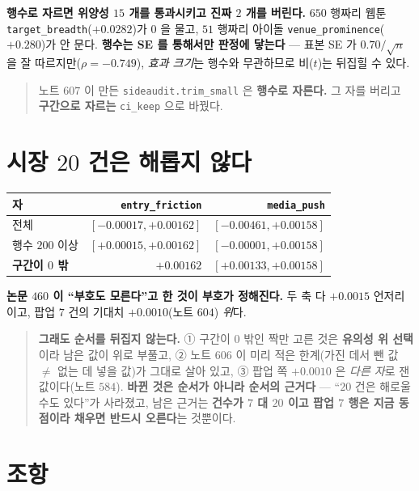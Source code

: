 \documentclass[11pt]{article}
\begin{document}
\textbf{행수로 자르면 위양성 $15$ 개를 통과시키고 진짜 $2$ 개를 버린다.}
$650$ 행짜리 웹툰 \texttt{target\_breadth}($+0.0282$)가 $0$ 을 물고,
$51$ 행짜리 아이돌 \texttt{venue\_prominence}($+0.280$)가 안 문다.
\textbf{행수는 SE 를 통해서만 판정에 닿는다} --- 표본 SE 가
$0.70/\sqrt{n}$ 을 잘 따르지만($\rho{=}-0.749$), \emph{효과 크기}는
행수와 무관하므로 비($t$)는 뒤집힐 수 있다.

\begin{quote}
노트 $607$ 이 만든 \texttt{sideaudit.trim\_small} 은 \textbf{행수로
자른다.} 그 자를 버리고 \textbf{구간으로 자르는} \texttt{ci\_keep} 으로
바꿨다.
\end{quote}

\section{시장 $20$ 건은 해롭지 않다}

\begin{center}
\begin{tabular}{lrr}
\hline
자 & \texttt{entry\_friction} & \texttt{media\_push} \\
\hline
전체 & $[-0.00017, +0.00162]$ & $[\mathbf{-0.00461}, +0.00158]$ \\
행수 $200$ 이상 & $[+0.00015, +0.00162]$ & $[-0.00001, +0.00158]$ \\
\textbf{구간이 $0$ 밖} & $\mathbf{+0.00162}$ & $[+0.00133, +0.00158]$ \\
\hline
\end{tabular}
\end{center}

\textbf{논문 $460$ 이 ``부호도 모른다''고 한 것이 부호가 정해진다.} 두
축 다 $+0.0015$ 언저리이고, 팝업 $7$ 건의 기대치 $+0.0010$(노트 $604$)
\emph{위}다.

\begin{quote}
\textbf{그래도 순서를 뒤집지 않는다.} ① 구간이 $0$ 밖인 짝만 고른 것은
\textbf{유의성 위 선택}이라 남은 값이 위로 부풀고, ② 노트 $606$ 이 미리
적은 한계(가진 데서 뺀 값 $\neq$ 없는 데 넣을 값)가 그대로 살아 있고,
③ 팝업 쪽 $+0.0010$ 은 \emph{다른 자}로 잰 값이다(노트 $584$).
\textbf{바뀐 것은 순서가 아니라 순서의 근거다} --- ``$20$ 건은 해로울 수도
있다''가 사라졌고, 남은 근거는 \textbf{건수가 $7$ 대 $20$ 이고 팝업 $7$
행은 지금 동점이라 채우면 반드시 오른다}는 것뿐이다.
\end{quote}

\section*{조항}
\end{document}
